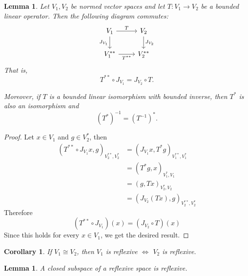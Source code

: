 \documentclass[11pt,a4paper]{article}
\theoremstyle{definition}
\theoremstyle{plain}
\newtheorem{lemma}[definition]{Lemma}
\newtheorem{corollary}[definition]{Corollary}
\theoremstyle{remark}
\newcommand{\1}{\mathbbm{1}}
\begin{document}
\begin{lemma}%
    Let $V_1,V_2$ be normed vector spaces and let
    $T:V_1\to V_2$ be a bounded linear operator.
    Then the following diagram commutes:
    \[
    \begin{tikzcd}
        V_1 \arrow[r, "T"] \arrow[d, "J_{V_1}"']
        & V_2 \arrow[d, "J_{V_2}"] \\
        V_1^{**} \arrow[r, "T^{**}"']
        & V_2^{**}
    \end{tikzcd}
    \]
    That is,
    \[
        T^{**}\circ J_{V_1}=J_{V_2}\circ T.
    \]

    Moreover, if $T$ is a bounded linear isomorphism
    with bounded inverse, then $T^*$ is also an
    isomorphism and
    \[
        (T^*)^{-1}=(T^{-1})^*.
    \]
\end{lemma}

\begin{proof}
    Let $x \in V_1$ and $g \in V_2^*$, then 
    \begin{align*}
        (T^{**} \circ J_{V_1} x, g)_{V_2^{**}, V_2^*} &= (J_{V_1}x, T^* g)_{V_1^{**}, V_1^*} \\
        &= (T^*g, x)_{V_1^*, V_1} \\
        &= (g, Tx)_{V_2^*, V_2} \\
        &= (J_{V_2} (Tx), g)_{V_2^{**}, V_2^*}
    \end{align*}
    Therefore 
    $$(T^{**} \circ J_{V_1}) (x) = (J_{V_2} \circ T) (x)$$
    Since this holds for every $x \in V_1$, we get the desired result.
\end{proof}

\begin{corollary}
    If $V_1 \cong V_2$, then $V_1$ is reflexive $\iff$ $V_2$ is reflexive. 
\end{corollary}

\begin{lemma}
    A closed subspace of a reflexive space is reflexive. 
\end{lemma}
\end{document}
